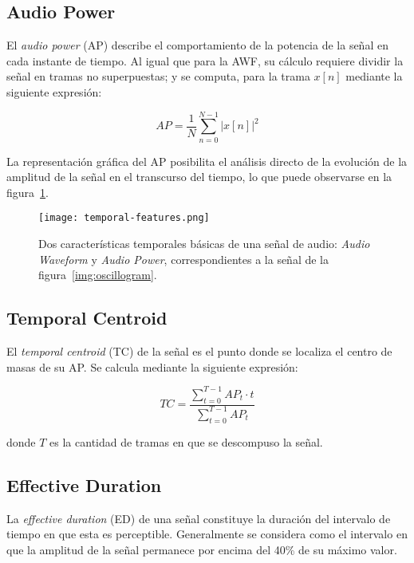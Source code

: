 \subsection{Audio Power}\label{subsec:audioPower}

El \textit{audio power} (AP) describe el comportamiento de la potencia de la señal en cada instante de tiempo.
Al igual que para la AWF, su cálculo requiere dividir la señal en tramas no superpuestas;
y se computa, para la trama $x[n]$ mediante la siguiente expresión:

\begin{equation}
    \label{eq:AP}
    AP = \frac{1}{N}\sum_{n=0}^{N-1}{|x[n]|^2}
\end{equation}

La representación gráfica del AP posibilita el análisis directo de la evolución de la amplitud de la señal en el transcurso del tiempo, lo que puede observarse en la figura~\ref{img:awf+ap}.

\begin{figure}[!h]
    \centering
    \texttt{[image: temporal-features.png]}
    \caption{Dos características temporales básicas de una señal de audio: \textit{Audio Waveform} y \textit{Audio Power}, correspondientes a la señal de la figura~\ref{img:oscillogram}.}
    \label{img:awf+ap}
\end{figure}

\subsection{Temporal Centroid}\label{subsec:temporalCentroid}

El \textit{temporal centroid} (TC) de la señal es el punto donde se localiza el centro de masas de su AP\@.
Se calcula mediante la siguiente expresión:

\begin{equation}
    \label{eq:TC}
    TC = \frac{\sum_{t=0}^{T-1}{AP_t \cdot t}}{\sum_{t=0}^{T-1}{AP_t}}
\end{equation}

\noindent
donde $T$ es la cantidad de tramas en que se descompuso la señal.

\subsection{Effective Duration}\label{subsec:effectiveDuration}

La \textit{effective duration} (ED) de una señal constituye la duración del intervalo de tiempo en que esta es perceptible.
Generalmente se considera como el intervalo en que la amplitud de la señal permanece por encima del 40\% de su máximo valor.

